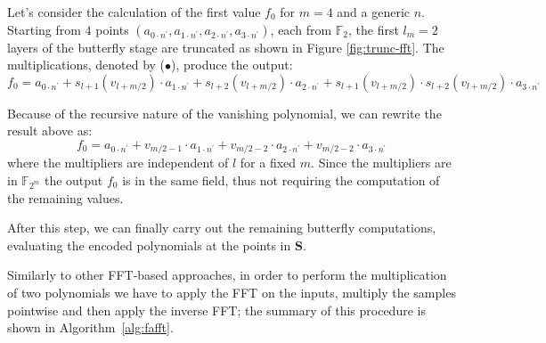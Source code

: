         \begin{example}
            Let's consider the calculation of the first value $f_0$ for $m=4$ and a generic $n$. Starting from $4$ points
            $(a_{0\cdot n^\prime}, a_{1\cdot n^\prime}, a_{2\cdot n^\prime}, a_{3\cdot n^\prime})$, each from $\mathds{F}_2$,
            the first $l_m=2$ layers of the butterfly stage are truncated as shown in Figure \ref{fig:trunc-fft}. 
            The multiplications, denoted by ($\bullet$), produce the output:
            \begin{equation*}
                f_0 = a_{0\cdot n^\prime} + s_{l+1}(v_{l+m/2})\cdot a_{1\cdot n^\prime} + s_{l+2}(v_{l+m/2})\cdot a_{2\cdot n^\prime} + s_{l+1}(v_{l+m/2})\cdot s_{l+2}(v_{l+m/2})\cdot a_{3\cdot n^\prime}
            \end{equation*}
            
            Because of the recursive nature of the vanishing polynomial, we can rewrite the result above as:
            \begin{equation*}
                f_0 = a_{0\cdot n^\prime} + v_{m/2-1}\cdot a_{1\cdot n^\prime} + v_{m/2-2}\cdot a_{2\cdot n^\prime} + v_{m/2-2}\cdot a_{3\cdot n^\prime} 
            \end{equation*}
            where the multipliers are independent of $l$ for a fixed $m$. Since the multipliers are in $\mathds{F}_{2^m}$ the output $f_0$ is in the same field, 
            thus not requiring the computation of the remaining values.
        \end{example}

    After this step, we can finally carry out the remaining butterfly computations, evaluating the encoded polynomials at the points in $\mathbf{S}$.

    

    Similarly to other FFT-based approaches, in order to perform the multiplication of two polynomials we have to apply the FFT on the inputs, 
    multiply the samples pointwise and then apply the inverse FFT; the summary of this procedure is shown in Algorithm~\ref{alg:fafft}.


